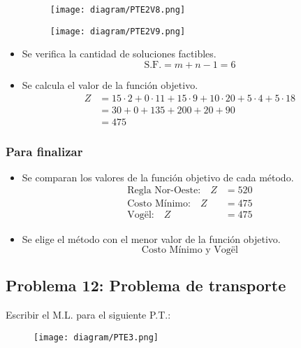 \documentclass{templateNote}
\begin{document}
\begin{itemize}
    \begin{figure}[H]
        \centering
        \texttt{[image: diagram/PTE2V8.png]}
    \end{figure}
    
    \begin{figure}[H]
        \centering
        \texttt{[image: diagram/PTE2V9.png]}
    \end{figure}

    \item Se verifica la cantidad de soluciones factibles.
    \begin{equation*}
        \text{S.F.} = m+n-1 = 6
    \end{equation*}

    \item Se calcula el valor de la función objetivo.
    \begin{align*}
        Z &= 15 \cdot 2 + 0 \cdot 11 + 15 \cdot 9 + 10 \cdot 20 + 5 \cdot 4 + 5 \cdot 18\\
        &= 30 + 0 + 135 + 200 + 20 + 90 \\
        &= 475
    \end{align*}
\end{itemize}

\subsubsection*{Para finalizar}
\begin{itemize}
    \item Se comparan los valores de la función objetivo de cada método.
    \begin{align*}
        \text{Regla Nor-Oeste:} \quad Z &= 520 \\
        \text{Costo Mínimo:} \quad Z &= 475 \\
        \text{Vogël:} \quad Z &= 475
    \end{align*}

    \item Se elige el método con el menor valor de la función objetivo.
    \begin{equation*}
        \text{Costo Mínimo y Vogël}
    \end{equation*}
\end{itemize}

\subsection*{Problema 12: Problema de transporte}
Escribir el M.L. para el siguiente P.T.:
\begin{figure}[H]
    \centering
    \texttt{[image: diagram/PTE3.png]}
\end{figure}
\end{document}
